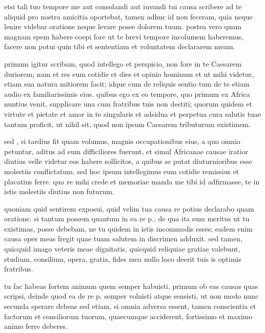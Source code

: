 


 etsi tali tuo tempore me aut consolandi aut iuvandi tui causa scribere ad te aliquid pro nostra amicitia oportebat, tamen adhuc id non feceram, quia neque lenire videbar oratione neque levare posse dolorem tuum. postea vero quam magnam spem habere coepi fore ut te brevi tempore incolumem haberemus, facere non potui quin tibi et sententiam et voluntatem declararem meam.

 primum igitur scribam, quod intellego et perspicio, non fore in te Caesarem duriorem; nam et res eum cotidie et dies et opinio hominum et ut mihi videtur, etiam sua natura mitiorem facit; idque cum de reliquis sentio tum de te etiam audio ex familiarissimis eius. quibus ego ex eo tempore, quo primum ex Africa nuntius venit, supplicare una cum fratribus tuis non destiti; quorum quidem et virtute et pietate et amor in te singularis et adsidua et perpetua cura salutis tuae tantum proficit, ut nihil sit, quod non ipsum Caesarem tributurum existimem.

 sed , si tardius fit quam volumus, magnis occupationibus eius, a quo omnia petuntur, aditus ad eum difficiliores fuerunt, et simul Africanae causae iratior diutius velle videtur eos habere sollicitos, a quibus se putat diuturnioribus esse molestiis conflictatum. sed hoc ipsum intellegimus eum cotidie remissius et placatius ferre. qua re mihi crede et memoriae manda me tibi id adfirmasse, te in istis molestiis diutius non futurum.

 quoniam quid sentirem exposui, quid velim tua causa re potius declarabo quam oratione. si tantum possem quantum in ea re p., de qua ita sum meritus ut tu existimas, posse debebam, ne tu quidem in istis incommodis esses; eadem enim causa opes meas fregit quae tuam salutem in discrimen adduxit. sed tamen, quicquid imago veteris meae dignitatis, quicquid reliquiae gratiae valebunt, studium, consilium, opera, gratia, fides mea nullo loco deerit tuis is optimis fratribus.

 tu fac habeas fortem animum quem semper habuisti, primum ob eas causas quas scripsi, deinde quod ea de re p. semper voluisti atque sensisti, ut non modo nunc secunda sperare debeas sed etiam, si omnia adversa essent, tamen conscientia et factorum et consiliorum tuorum, quaecumque acciderent, fortissimo et maximo animo ferre deberes.
